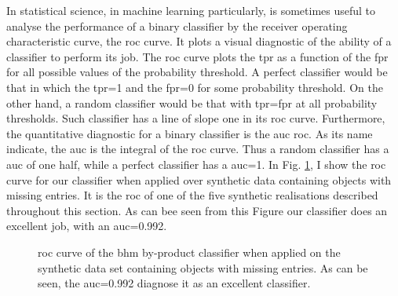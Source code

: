 In statistical science,  in machine learning particularly, is sometimes useful to analyse the performance of a binary classifier by the receiver operating characteristic curve, the \gls{roc} curve. It plots a visual diagnostic of the ability of a classifier to perform its job. The \gls{roc} curve plots the \gls{tpr} as a function of the \gls{fpr} for all possible values of the probability threshold. A perfect classifier would be that in which the \gls{tpr}=1 and the \gls{fpr}=0 for some probability threshold. On the other hand, a random classifier would be that with \gls{tpr}=\gls{fpr} at all probability thresholds. Such classifier has a line of slope one in its \gls{roc} curve. Furthermore, the quantitative diagnostic for a binary classifier is the \gls{auc} \gls{roc}. As its name indicate, the \gls{auc} is the integral of the \gls{roc} curve. Thus a random classifier has a \gls{auc} of one half, while a perfect classifier has a \gls{auc}=1. In Fig. \ref{fig:ROC}, I show the \gls{roc} curve for our classifier when applied over synthetic data containing objects with missing entries. It is the \gls{roc} of one of the five synthetic realisations described throughout this section. As can bee seen from this Figure our classifier does an excellent job, with an \gls{auc}=0.992.

\begin{figure}[!htp]
\begin{center}
\caption{\gls{roc} curve of the \gls{bhm} by-product classifier when applied on the synthetic data set containing objects with missing entries. As can be seen, the \gls{auc}=0.992 diagnose it as an excellent classifier.}
\label{fig:ROC}
\end{center}
\end{figure}

